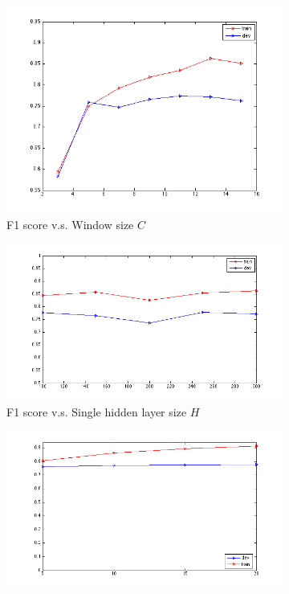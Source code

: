 \documentclass[letterpaper]{article}
\begin{document}
\begin{figure}[ht]
\centering
\begin{subfigure}{.5\textwidth}
  \includegraphics[scale=0.5, width=1.0\linewidth]{window.png}
  \caption{F1 score v.s. Window size $C$}
  \label{fig:window}
\end{subfigure}%
\begin{subfigure}{.5\textwidth}
  \includegraphics[scale=0.5, width=1.0\linewidth]{hidden.png}
  \caption{F1 score v.s. Single hidden layer size $H$}
  \label{fig:hidden}
\end{subfigure}
\begin{subfigure}{.5\textwidth}
  \includegraphics[scale=0.5, width=1.0\linewidth]{epoch.png}

\end{subfigure}
\end{figure}
\end{document}
